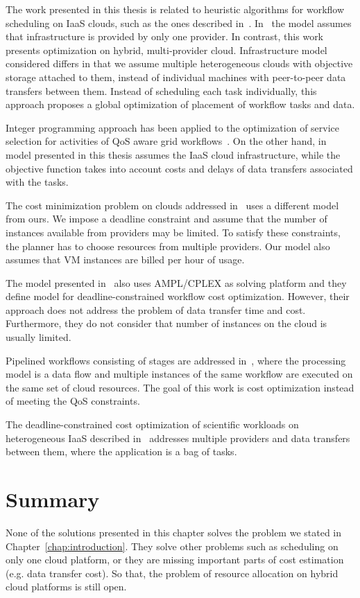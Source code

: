 The work presented in this thesis is related to heuristic algorithms for workflow scheduling on IaaS clouds, such as the ones described in~\cite{Abrishami2013158,Mao11,BarrionuevoFP12,BittencourtM11}. In~\cite{Abrishami2013158} the model assumes that infrastructure is provided by only one provider. In contrast, this work presents optimization on hybrid, multi-provider cloud. Infrastructure model considered differs in that we assume multiple heterogeneous clouds with objective storage attached to them, instead of individual machines with peer-to-peer data transfers between them. Instead of scheduling each task individually, this approach proposes a global optimization of placement of workflow tasks and data.

Integer programming approach has been applied to the optimization of service selection for activities of QoS aware grid workflows~\cite{Brandic08}. On the other hand, in model presented in this thesis assumes the IaaS cloud infrastructure, while the objective function takes into account costs and delays of data transfers associated with the tasks.

The cost minimization problem on clouds addressed in~\cite{Pandey2010} uses a different model from ours. We impose a deadline constraint and assume that the number of instances available from providers may be limited. To satisfy these constraints, the planner has to choose resources from multiple providers. Our model also assumes that VM instances are billed per hour of usage.

The model presented in~\cite{Genez2012} also uses AMPL/CPLEX as solving platform and they define model for deadline-constrained workflow cost optimization. However, their approach does not address the problem of data transfer time and cost. Furthermore, they do not consider that number of instances on the cloud is usually limited. 

Pipelined workflows consisting of stages are addressed in~\cite{TolosanaCalasanz20121300}, where the processing model is a data flow and multiple instances of the same workflow are executed on the same set of cloud resources. The goal of this work is cost optimization instead of meeting the QoS constraints.

The deadline-constrained cost optimization of scientific workloads on heterogeneous IaaS described in~\cite{VandenBossche2013973} addresses multiple providers and data transfers between them, where the application is a bag of tasks.

\section{Summary}

None of the solutions presented in this chapter solves the problem we stated in Chapter~\ref{chap:introduction}. They solve other problems such as scheduling on only one cloud platform, or they are missing important parts of cost estimation (e.g. data transfer cost). So that, the problem of resource allocation on hybrid cloud platforms is still open.